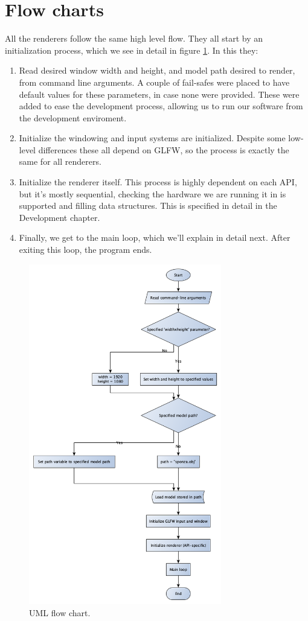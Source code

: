 \section{Flow charts}
All the renderers follow the same high level flow. They all start by an initialization process, which we see in detail in figure \ref{init-flowchart}. In this they: 
\begin{enumerate}

\item Read desired window width and height, and model path desired to render, from command line arguments. A couple of fail-safes were placed to have default values for these parameters, in case none were provided. These were added to ease the development process, allowing us to run our software from the development enviroment. 
\item Initialize the windowing and input systems are initialized. Despite some low-level differences these all depend on GLFW, so the process is exactly the same for all renderers.
\item Initialize the renderer itself. This process is highly dependent on each API, but it's mostly sequential, checking the hardware we are running it in is supported and filling data structures. This is specified in detail in the Development chapter.
\item Finally, we get to the main loop, which we'll explain in detail next. After exiting this loop, the program ends.
\end{enumerate}
\begin{figure}[hbt!]
  \centering
  \includegraphics[width=0.75\textwidth]{figuras/init-flowchart.png}
  \caption{UML flow chart.}
  \label{init-flowchart}
\end{figure}

